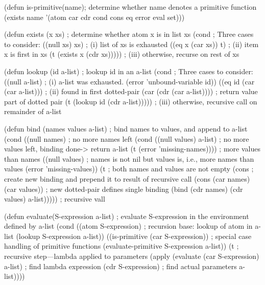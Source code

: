 \begin {frame}[fragile]
\begin {LISP}
(defun is-primitive(name); determine whether name denotes a primitive function
  (exists name '(atom car cdr cond cons eq error eval set)))

\end {LISP}

\begin {frame}[fragile]
\begin {LISP}
(defun exists (x xs) ; determine whether atom x is in list xs
  (cond ; Three cases to consider:
    ((null xs) xs) ; (i) list of xs is exhausted
    ((eq x (car xs)) t) ; (ii) item x is first in xs
    (t (exists x (cdr xs))))) ; (iii) otherwise, recurse on rest of xs

\end {LISP}

\begin {frame}[fragile]
\begin {LISP}
(defun lookup (id a-list) ; lookup id in an a-list
  (cond ; Three cases to consider:
    ((null a-list) ; (i) a-list was exhausted.
      (error 'unbound-variable id))
    ((eq id (car (car a-list))) ; (ii) found in first dotted-pair
      (car (cdr (car a-list)))) ; return value part of dotted pair
    (t (lookup id (cdr a-list))))) ; (iii) otherwise, recursive call on remainder of a-list

\end {LISP}

\begin {frame}[fragile]
\begin {LISP}
(defun bind (names values a-list) ; bind names to values, and append to a-list
  (cond ((null names) ; no more names left
        (cond ((null values) a-list) ; no more values left, binding done-> return a-list
              (t (error 'missing-names)))) ; more values than names
        ((null values) ; names is not nil but values is, i.e., more names than values
          (error 'missing-values))
        (t ; both names and values are not empty
          (cons ; create new binding and prepend it to result of recursive call
            (cons (car names) (car values)) ; new dotted-pair defines single binding
            (bind (cdr names) (cdr values) a-list))))) ; recursive vall

\end {LISP}

\begin {frame}[fragile]
\begin {LISP}
(defun evaluate(S-expression a-list) ; evaluate S-expression in the environment defined by a-list
  (cond ((atom S-expression) ; recursion base: lookup of atom in a-list
          (lookup S-expression a-list))
        ((is-primitive (car S-expression)) ; special case handling of primitive functions
          (evaluate-primitive S-expression a-list))
        (t ; recursive step---lambda applied to parameters
          (apply (evaluate (car S-expression) a-list) ; find lambda expression
                  (cdr S-expression) ; find actual parameters
                  a-list))))


\end{LISP}
\end{frame}
\end{frame}
\end{frame}
\end{frame}
\end{frame}
